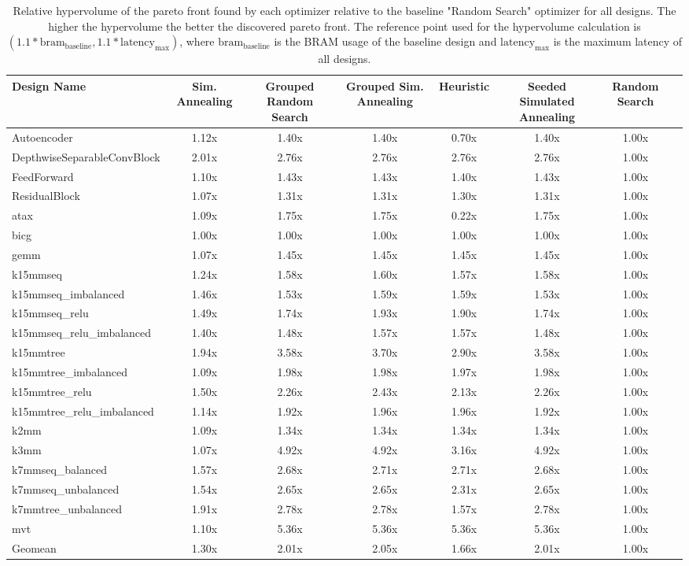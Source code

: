 \begin{table}[th]
\caption{Relative hypervolume of the pareto front found by each optimizer relative to the baseline "Random Search" optimizer for all designs. The higher the hypervolume the better the discovered pareto front. The reference point used for the hypervolume calculation is $(1.1*\text{bram}_\text{baseline}, 1.1*\text{latency}_\text{max})$, where $\text{bram}_\text{baseline}$ is the BRAM usage of the baseline design and $\text{latency}_\text{max}$ is the maximum latency of all designs.}
\label{tab:hypervolume}
\begin{tabular}{l|ccccccc}
\toprule
Design Name & Sim. Annealing & Grouped Random Search & Grouped Sim. Annealing & Heuristic & Seeded Simulated Annealing & Random Search \\
\midrule
Autoencoder & 1.12x & 1.40x & 1.40x & 0.70x & 1.40x & 1.00x \\
DepthwiseSeparableConvBlock & 2.01x & 2.76x & 2.76x & 2.76x & 2.76x & 1.00x \\
FeedForward & 1.10x & 1.43x & 1.43x & 1.40x & 1.43x & 1.00x \\
ResidualBlock & 1.07x & 1.31x & 1.31x & 1.30x & 1.31x & 1.00x \\
atax & 1.09x & 1.75x & 1.75x & 0.22x & 1.75x & 1.00x \\
bicg & 1.00x & 1.00x & 1.00x & 1.00x & 1.00x & 1.00x \\
gemm & 1.07x & 1.45x & 1.45x & 1.45x & 1.45x & 1.00x \\
k15mmseq & 1.24x & 1.58x & 1.60x & 1.57x & 1.58x & 1.00x \\
k15mmseq\_imbalanced & 1.46x & 1.53x & 1.59x & 1.59x & 1.53x & 1.00x \\
k15mmseq\_relu & 1.49x & 1.74x & 1.93x & 1.90x & 1.74x & 1.00x \\
k15mmseq\_relu\_imbalanced & 1.40x & 1.48x & 1.57x & 1.57x & 1.48x & 1.00x \\
k15mmtree & 1.94x & 3.58x & 3.70x & 2.90x & 3.58x & 1.00x \\
k15mmtree\_imbalanced & 1.09x & 1.98x & 1.98x & 1.97x & 1.98x & 1.00x \\
k15mmtree\_relu & 1.50x & 2.26x & 2.43x & 2.13x & 2.26x & 1.00x \\
k15mmtree\_relu\_imbalanced & 1.14x & 1.92x & 1.96x & 1.96x & 1.92x & 1.00x \\
k2mm & 1.09x & 1.34x & 1.34x & 1.34x & 1.34x & 1.00x \\
k3mm & 1.07x & 4.92x & 4.92x & 3.16x & 4.92x & 1.00x \\
k7mmseq\_balanced & 1.57x & 2.68x & 2.71x & 2.71x & 2.68x & 1.00x \\
k7mmseq\_unbalanced & 1.54x & 2.65x & 2.65x & 2.31x & 2.65x & 1.00x \\
k7mmtree\_unbalanced & 1.91x & 2.78x & 2.78x & 1.57x & 2.78x & 1.00x \\
mvt & 1.10x & 5.36x & 5.36x & 5.36x & 5.36x & 1.00x \\
\hline
Geomean & 1.30x & 2.01x & 2.05x & 1.66x & 2.01x & 1.00x & \\
\bottomrule

\end{tabular}
\end{table}
